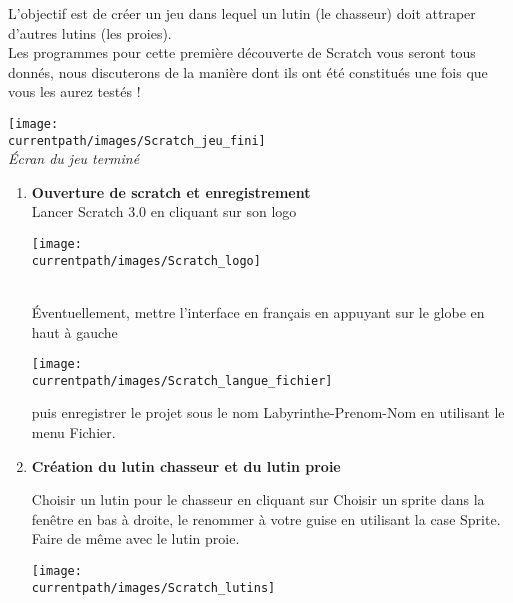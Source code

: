 \begin{changemargin}{-10mm}{-10mm}
\begin{enigme}
   L'objectif est de créer un jeu dans lequel un lutin (le chasseur) doit attraper d'autres lutins (les proies). \\
   Les programmes pour cette première découverte de Scratch vous seront tous donnés, nous discuterons de la manière dont ils ont été constitués une fois que vous les aurez testés !
   \begin{center}
      \texttt{[image: \\currentpath/images/Scratch\_jeu\_fini]} \\
      {\it Écran du jeu terminé}
   \end{center}

   \begin{enumerate}
      \item {\bf Ouverture de scratch et enregistrement} \dotfill \\ [1mm]
         Lancer \textcolor{B1}{Scratch 3.0} en cliquant sur son logo \parbox{1cm}{\texttt{[image: \\currentpath/images/Scratch\_logo]}} \\
         Éventuellement, mettre l'interface en français en appuyant sur le \textcolor{B1}{globe} en haut à gauche \parbox{2.5cm}{\texttt{[image: \\currentpath/images/Scratch\_langue\_fichier]}} puis enregistrer le projet sous le nom \og Labyrinthe-Prenom-Nom \fg{} en utilisant le menu \textcolor{B1}{Fichier}. \\

      \item {\bf Création du lutin chasseur et du lutin proie} \dotfill \\ 
         \begin{minipage}{8cm}
            Choisir un lutin pour le chasseur en cliquant sur \textcolor{B1}{Choisir un sprite} dans la fenêtre en bas à droite, le renommer à votre guise en utilisant la case \textcolor{B1}{Sprite}. \\
            Faire de même avec le lutin proie.
         \end{minipage}
         \qquad
         \begin{minipage}{7cm}
            \texttt{[image: \\currentpath/images/Scratch\_lutins]}
         \end{minipage}
 

\end{enumerate}
\end{enigme}
\end{changemargin}
